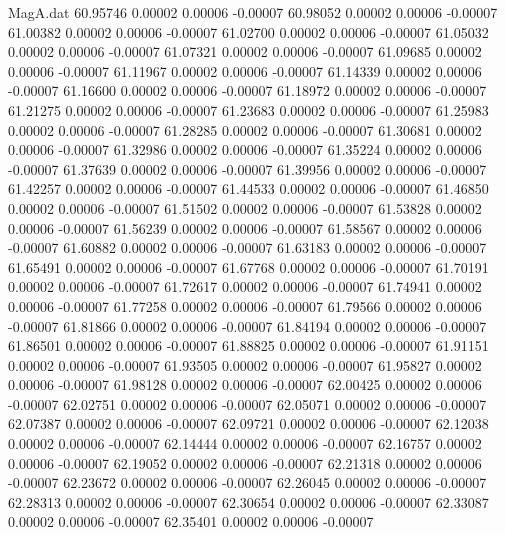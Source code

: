 \begin{filecontents}{MagA.dat}
  60.95746    0.00002    0.00006   -0.00007
  60.98052    0.00002    0.00006   -0.00007
  61.00382    0.00002    0.00006   -0.00007
  61.02700    0.00002    0.00006   -0.00007
  61.05032    0.00002    0.00006   -0.00007
  61.07321    0.00002    0.00006   -0.00007
  61.09685    0.00002    0.00006   -0.00007
  61.11967    0.00002    0.00006   -0.00007
  61.14339    0.00002    0.00006   -0.00007
  61.16600    0.00002    0.00006   -0.00007
  61.18972    0.00002    0.00006   -0.00007
  61.21275    0.00002    0.00006   -0.00007
  61.23683    0.00002    0.00006   -0.00007
  61.25983    0.00002    0.00006   -0.00007
  61.28285    0.00002    0.00006   -0.00007
  61.30681    0.00002    0.00006   -0.00007
  61.32986    0.00002    0.00006   -0.00007
  61.35224    0.00002    0.00006   -0.00007
  61.37639    0.00002    0.00006   -0.00007
  61.39956    0.00002    0.00006   -0.00007
  61.42257    0.00002    0.00006   -0.00007
  61.44533    0.00002    0.00006   -0.00007
  61.46850    0.00002    0.00006   -0.00007
  61.51502    0.00002    0.00006   -0.00007
  61.53828    0.00002    0.00006   -0.00007
  61.56239    0.00002    0.00006   -0.00007
  61.58567    0.00002    0.00006   -0.00007
  61.60882    0.00002    0.00006   -0.00007
  61.63183    0.00002    0.00006   -0.00007
  61.65491    0.00002    0.00006   -0.00007
  61.67768    0.00002    0.00006   -0.00007
  61.70191    0.00002    0.00006   -0.00007
  61.72617    0.00002    0.00006   -0.00007
  61.74941    0.00002    0.00006   -0.00007
  61.77258    0.00002    0.00006   -0.00007
  61.79566    0.00002    0.00006   -0.00007
  61.81866    0.00002    0.00006   -0.00007
  61.84194    0.00002    0.00006   -0.00007
  61.86501    0.00002    0.00006   -0.00007
  61.88825    0.00002    0.00006   -0.00007
  61.91151    0.00002    0.00006   -0.00007
  61.93505    0.00002    0.00006   -0.00007
  61.95827    0.00002    0.00006   -0.00007
  61.98128    0.00002    0.00006   -0.00007
  62.00425    0.00002    0.00006   -0.00007
  62.02751    0.00002    0.00006   -0.00007
  62.05071    0.00002    0.00006   -0.00007
  62.07387    0.00002    0.00006   -0.00007
  62.09721    0.00002    0.00006   -0.00007
  62.12038    0.00002    0.00006   -0.00007
  62.14444    0.00002    0.00006   -0.00007
  62.16757    0.00002    0.00006   -0.00007
  62.19052    0.00002    0.00006   -0.00007
  62.21318    0.00002    0.00006   -0.00007
  62.23672    0.00002    0.00006   -0.00007
  62.26045    0.00002    0.00006   -0.00007
  62.28313    0.00002    0.00006   -0.00007
  62.30654    0.00002    0.00006   -0.00007
  62.33087    0.00002    0.00006   -0.00007
  62.35401    0.00002    0.00006   -0.00007

\end{filecontents}
